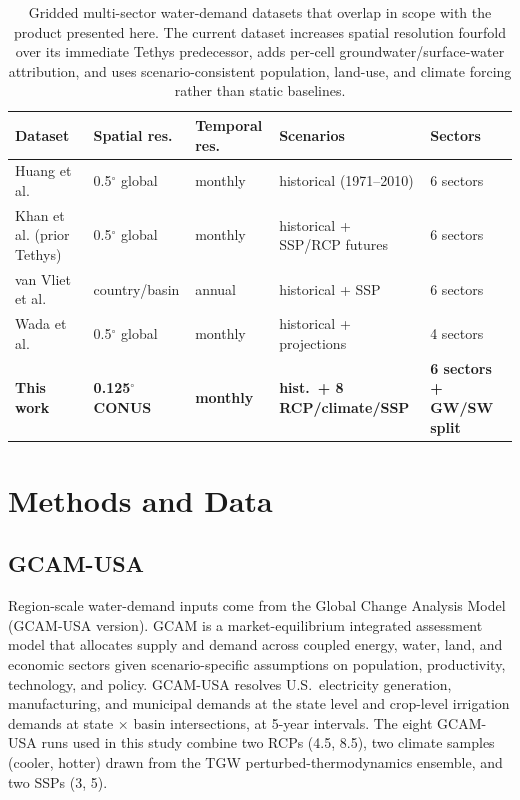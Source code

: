 \documentclass[fleqn,10pt]{wlscirep}
\begin{document}
\begin{table}[ht]
\centering
\small
\begin{tabular}{lllll}
\toprule
\textbf{Dataset} & \textbf{Spatial res.} & \textbf{Temporal res.} & \textbf{Scenarios} & \textbf{Sectors} \\
\midrule
Huang et al.\cite{hess-22-2117-2018}           & 0.5$^{\circ}$ global & monthly & historical (1971--2010) & 6 sectors \\
Khan et al.\cite{Khan2023} (prior Tethys)      & 0.5$^{\circ}$ global & monthly & historical + SSP/RCP futures & 6 sectors \\
van Vliet et al.\cite{van_Vliet_2021}          & country/basin & annual & historical + SSP & 6 sectors \\
Wada et al.\cite{Wada_2017}                    & 0.5$^{\circ}$ global & monthly & historical + projections & 4 sectors \\
\textbf{This work}                             & \textbf{0.125$^{\circ}$ CONUS} & \textbf{monthly} & \textbf{hist.\ + 8 RCP/climate/SSP} & \textbf{6 sectors + GW/SW split} \\
\bottomrule
\end{tabular}
\caption{Gridded multi-sector water-demand datasets that overlap in scope with the product presented here. The current dataset increases spatial resolution fourfold over its immediate Tethys predecessor\cite{Khan2023}, adds per-cell groundwater/surface-water attribution, and uses scenario-consistent population, land-use, and climate forcing rather than static baselines.}
\label{tab:prior-datasets}
\end{table}

\section*{Methods and Data}

\subsection*{GCAM-USA}

Region-scale water-demand inputs come from the Global Change Analysis Model (GCAM-USA version)\cite{Zhao_gcamusa_water, Zhao2024, Calvin2019GCAM, Binsted_2022}. GCAM is a market-equilibrium integrated assessment model that allocates supply and demand across coupled energy, water, land, and economic sectors given scenario-specific assumptions on population, productivity, technology, and policy. GCAM-USA resolves U.S.~electricity generation, manufacturing, and municipal demands at the state level and crop-level irrigation demands at state $\times$ basin intersections, at 5-year intervals. 
The eight GCAM-USA runs used in this study combine two RCPs (4.5, 8.5), two climate samples (cooler, hotter) drawn from the TGW perturbed-thermodynamics ensemble, and two SSPs (3, 5).
\end{document}
